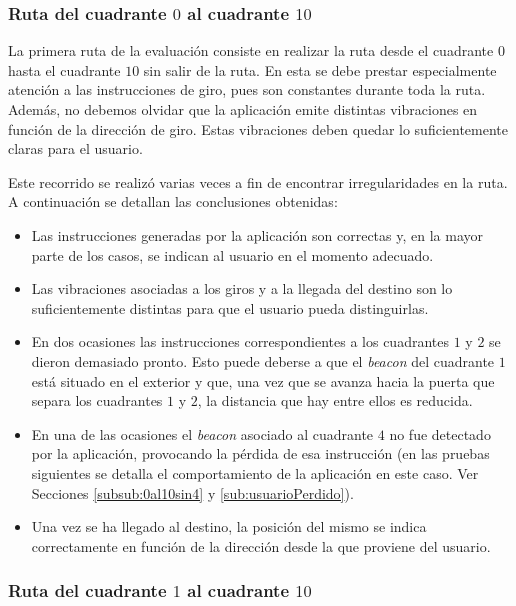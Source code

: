 \subsubsection{Ruta del cuadrante $0$ al cuadrante $10$}
\label{subsub:0al10}
La primera ruta de la evaluación consiste en realizar la ruta desde el cuadrante $0$ hasta el cuadrante $10$ sin salir de la ruta. En esta se debe prestar especialmente atención a las instrucciones de giro, pues son constantes durante toda la ruta. Además, no debemos olvidar que la aplicación emite distintas vibraciones en función de la dirección de giro. Estas vibraciones deben quedar lo suficientemente claras para el usuario. 

Este recorrido se realizó varias veces a fin de encontrar irregularidades en la ruta. A continuación se detallan las conclusiones obtenidas:

\begin{itemize}
	\item Las instrucciones generadas por la aplicación son correctas y, en la mayor parte de los casos, se indican al usuario en el momento adecuado.
	
	\item Las vibraciones asociadas a los giros y a la llegada del destino son lo suficientemente distintas para que el usuario pueda distinguirlas.
	
	\item En dos ocasiones las instrucciones correspondientes a los cuadrantes $1$ y $2$ se dieron demasiado pronto. Esto puede deberse a que el \textit{beacon} del cuadrante $1$ está situado en el exterior y que, una vez que se avanza hacia la puerta que separa los cuadrantes $1$ y $2$, la distancia que hay entre ellos es reducida.
	
	\item En una de las ocasiones el \textit{beacon} asociado al cuadrante $4$ no fue detectado por la aplicación, provocando la pérdida de esa instrucción (en las pruebas siguientes se detalla el comportamiento de la aplicación en este caso. Ver Secciones \ref{subsub:0al10sin4} y \ref{sub:usuarioPerdido}).
	
	\item Una vez se ha llegado al destino, la posición del mismo se indica correctamente en función de la dirección desde la que proviene del usuario.
	
\end{itemize}

\subsubsection{Ruta del cuadrante $1$ al cuadrante $10$}

